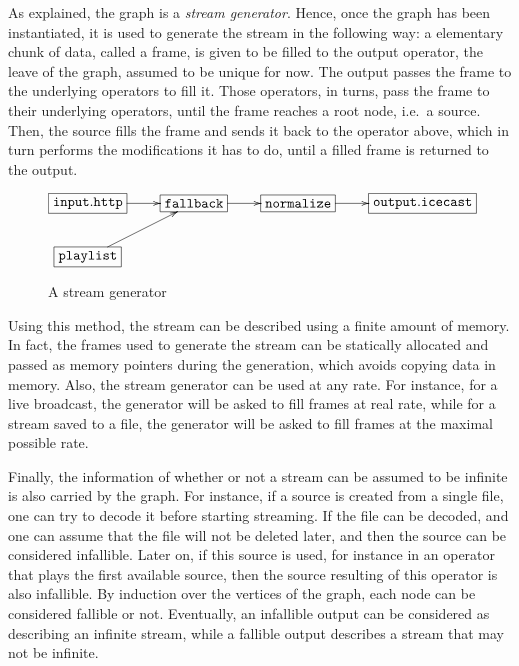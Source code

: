 \documentclass{llncs}
\newcommand{\ie}{{i.e.}}
\begin{document}
As explained, the graph is a \textit{stream generator}. Hence, once the graph has been instantiated,
it is used to generate the stream in the following way: a elementary chunk of data, called a frame, is given to be filled to the 
output operator, the leave of the graph, assumed to be unique for now. 
The output passes the frame to the underlying operators to fill it. Those operators, in turns, pass the frame to their 
underlying operators, until the frame reaches a root node, \ie\ a source. 
Then, the source fills the frame and sends it back to the operator above, which in turn performs
the modifications it has to do, until a filled frame is returned to the output.

\begin{figure}[htn]
 \begin{center}
\[
\xymatrix{
  *+[F]{\mathtt{input.http}}\ar[r]&*+[F]{\mathtt{fallback}}\ar[r]&
  *+[F]{\mathtt{normalize}}\ar[r]&
  *+[F]{\mathtt{output.icecast}}\\
  *+[F]{\mathtt{playlist}}\ar[ur]&\\
}
\]
\end{center}
 \caption{A stream generator}
\end{figure}

Using this method, the stream can be described using a finite amount of memory. In fact, the frames used
to generate the stream can be statically allocated and passed as memory pointers during the generation, which 
avoids copying data in memory. Also, the stream generator can be used at any rate. For instance,
for a live broadcast, the generator will be asked to fill frames at real rate, while 
for a stream saved to a file, the generator will be asked to fill frames at the maximal possible rate.

Finally, the information of whether or not a stream can be assumed to be infinite is also carried by the 
graph. For instance, if a source is created from a single file, one can try to decode it before starting 
streaming. If the file can be decoded, and one can assume that the file will not be deleted later, and then 
the source can be considered infallible. Later on, if this source is used, for instance in an operator that plays 
the first available source, then the source resulting of this operator is also infallible.
By induction over the vertices of the graph, each node can be considered fallible or not. Eventually,
an infallible output can be considered as describing an infinite stream, while a fallible
output describes a stream that may not be infinite.
\end{document}
